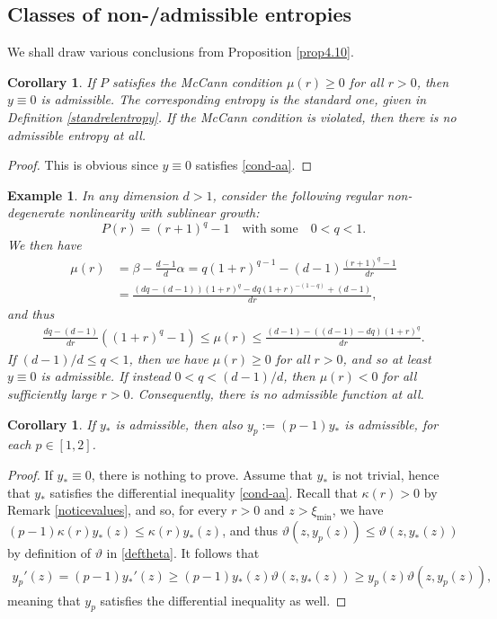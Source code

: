 \documentclass[reqno]{amsart}
\newtheorem{corollary}[lemma]{Corollary}
\newtheorem{example}[lemma]{Example}
\begin{document}
\subsection{Classes of non-/admissible entropies}
We shall draw various conclusions from Proposition \ref{prop4.10}.
%
\begin{corollary}
  If $P$ satisfies the McCann condition $\mu(r)\ge0$ for all $r>0$, then $y\equiv0$ is admissible. The corresponding entropy is the standard one, given in Definition \ref{standrelentropy}. If the McCann condition is violated, then there is no admissible entropy at all.
\end{corollary}
%
\begin{proof}
  This is obvious since $y\equiv0$ satisfies \eqref{cond-aa}.
\end{proof}
%
\begin{example}
    In any dimension $d>1$, consider the following regular non-degenerate nonlinearity with sublinear growth:
    \[ P(r) = (r+1)^q-1 \quad\text{with some}\quad 0<q<1.\]
    We then have
    \begin{align*}
        \mu(r) 
        &= \beta-\frac{d-1}d\alpha 
        = q(1+r)^{q-1}-(d-1)\frac{(r+1)^q-1}{dr} \\
        &=\frac{(dq-(d-1))(1+r)^q-dq(1+r)^{-(1-q)}+(d-1)}{dr},
    \end{align*}
    and thus
    \begin{align*}
        \frac{dq-(d-1)}{dr}((1+r)^q-1)\le\mu(r)\le\frac{(d-1)-((d-1)-dq)(1+r)^q}{dr}. 
    \end{align*}
    If $(d-1)/d\le q<1$, then we have $\mu(r)\ge0$ for all $r>0$, and so at least $y\equiv0$ is admissible. If instead $0<q<(d-1)/d$, then $\mu(r)<0$ for all sufficiently large $r>0$. Consequently, there is no admissible function at all.
\end{example}
%
\begin{corollary}\label{cor:pfamily}
  If $y_*$ is admissible, then also $y_p:=(p-1)y_*$ is admissible, for each $p\in[1,2]$.
\end{corollary}
%
\begin{proof}
    If $y_*\equiv0$, there is nothing to prove.
    Assume that $y_*$ is not trivial, hence that $y_*$ satisfies the differential inequality \eqref{cond-aa}.
    Recall that $\kappa(r)>0$ by Remark \ref{noticevalues}, and so, for every $r>0$ and $z>\xi_{\min}$, we have $(p-1)\kappa(r)y_*(z)\le\kappa(r)y_*(z)$,
    and thus $\vartheta(z,y_p(z))\le\vartheta(z,y_*(z))$ by definition of $\vartheta$ in \eqref{deftheta}. It follows that
    \begin{align*}
        y_p'(z) = (p-1)y_*'(z) \ge (p-1)y_*(z)\vartheta(z,y_*(z)) \ge y_p(z)\vartheta(z,y_p(z)),
    \end{align*}
    meaning that $y_p$ satisfies the differential inequality as well.
\end{proof}
\end{document}
